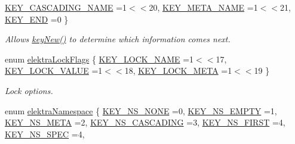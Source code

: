 \begin{DoxyCompactItemize}
\newline
\hyperlink{group__key_gga9b703ca49f48b482def322b77d3e6bc8afc1567f74444ff9c219f7456b652b4ec}{K\+E\+Y\+\_\+\+C\+A\+S\+C\+A\+D\+I\+N\+G\+\_\+\+N\+A\+ME} =1$<$$<$20, 
\hyperlink{group__key_gga9b703ca49f48b482def322b77d3e6bc8a5205cbd2831bc881da3589a95c08e054}{K\+E\+Y\+\_\+\+M\+E\+T\+A\+\_\+\+N\+A\+ME} =1$<$$<$21, 
\hyperlink{group__key_gga9b703ca49f48b482def322b77d3e6bc8aa8adb6fcb92dec58fb19410eacfdd403}{K\+E\+Y\+\_\+\+E\+ND} =0
 \}\begin{DoxyCompactList}\small\item\em Allows \hyperlink{group__key_gad23c65b44bf48d773759e1f9a4d43b89}{key\+New()} to determine which information comes next. \end{DoxyCompactList}
\item 
enum \hyperlink{group__key_gafa3306030b1d06b06c3cba24c516f5ec}{elektra\+Lock\+Flags} \{ \hyperlink{group__key_ggafa3306030b1d06b06c3cba24c516f5eca4813b0cfdefeb676e35f599ef763c265}{K\+E\+Y\+\_\+\+L\+O\+C\+K\+\_\+\+N\+A\+ME} =1$<$$<$17, 
\hyperlink{group__key_ggafa3306030b1d06b06c3cba24c516f5eca4ed4895f3f243287f7adef621815d7e6}{K\+E\+Y\+\_\+\+L\+O\+C\+K\+\_\+\+V\+A\+L\+UE} =1$<$$<$18, 
\hyperlink{group__key_ggafa3306030b1d06b06c3cba24c516f5eca4f1b7ee5af7539286d8989a9a5658958}{K\+E\+Y\+\_\+\+L\+O\+C\+K\+\_\+\+M\+E\+TA} =1$<$$<$19
 \}\begin{DoxyCompactList}\small\item\em Lock options. \end{DoxyCompactList}
\item 
enum \hyperlink{group__key_gaec3b8d6f430ae49b91bafe8a86310a68}{elektra\+Namespace} \{ \newline
\hyperlink{group__key_ggaec3b8d6f430ae49b91bafe8a86310a68a3659698b0a07454ca8055ab693e8efd1}{K\+E\+Y\+\_\+\+N\+S\+\_\+\+N\+O\+NE} =0, 
\hyperlink{group__key_ggaec3b8d6f430ae49b91bafe8a86310a68a33d6c53529b4e6921d0b1d6565df2f1f}{K\+E\+Y\+\_\+\+N\+S\+\_\+\+E\+M\+P\+TY} =1, 
\hyperlink{group__key_ggaec3b8d6f430ae49b91bafe8a86310a68ac5fbf2c3a7ae79fa2d60c48ae3e72688}{K\+E\+Y\+\_\+\+N\+S\+\_\+\+M\+E\+TA} =2, 
\hyperlink{group__key_ggaec3b8d6f430ae49b91bafe8a86310a68a2c9133e3095dccbcde5ca3bb13987b5d}{K\+E\+Y\+\_\+\+N\+S\+\_\+\+C\+A\+S\+C\+A\+D\+I\+NG} =3, 
\newline
\hyperlink{group__key_ggaec3b8d6f430ae49b91bafe8a86310a68ae06281f94c2b7a221115afbaa1e0ff45}{K\+E\+Y\+\_\+\+N\+S\+\_\+\+F\+I\+R\+ST} =4, 
\hyperlink{group__key_ggaec3b8d6f430ae49b91bafe8a86310a68a2be047b124b1ca0e92b5ef124169f0d2}{K\+E\+Y\+\_\+\+N\+S\+\_\+\+S\+P\+EC} =4, 
$$
\end{DoxyCompactItemize}
